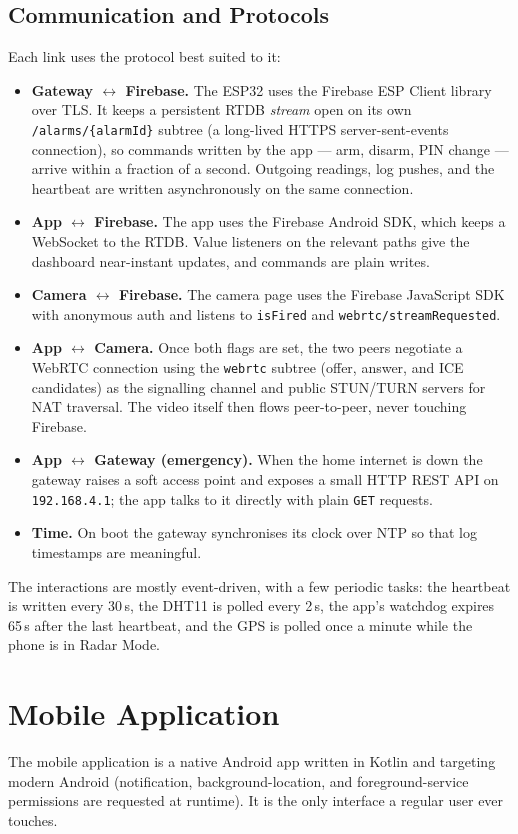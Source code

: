 \documentclass[10pt,twocolumn]{article}
\begin{document}
\subsection{Communication and Protocols}
Each link uses the protocol best suited to it:
\begin{itemize}
    \item \textbf{Gateway $\leftrightarrow$ Firebase.} The ESP32 uses the Firebase ESP Client library over TLS. It keeps a persistent RTDB \emph{stream} open on its own \texttt{/alarms/\{alarmId\}} subtree (a long-lived HTTPS server-sent-events connection), so commands written by the app --- arm, disarm, PIN change --- arrive within a fraction of a second. Outgoing readings, log pushes, and the heartbeat are written asynchronously on the same connection.
    \item \textbf{App $\leftrightarrow$ Firebase.} The app uses the Firebase Android SDK, which keeps a WebSocket to the RTDB. Value listeners on the relevant paths give the dashboard near-instant updates, and commands are plain writes.
    \item \textbf{Camera $\leftrightarrow$ Firebase.} The camera page uses the Firebase JavaScript SDK with anonymous auth and listens to \texttt{isFired} and \texttt{webrtc/streamRequested}.
    \item \textbf{App $\leftrightarrow$ Camera.} Once both flags are set, the two peers negotiate a WebRTC connection using the \texttt{webrtc} subtree (offer, answer, and ICE candidates) as the signalling channel and public STUN/TURN servers for NAT traversal. The video itself then flows peer-to-peer, never touching Firebase.
    \item \textbf{App $\leftrightarrow$ Gateway (emergency).} When the home internet is down the gateway raises a soft access point and exposes a small HTTP REST API on \texttt{192.168.4.1}; the app talks to it directly with plain \texttt{GET} requests.
    \item \textbf{Time.} On boot the gateway synchronises its clock over NTP so that log timestamps are meaningful.
\end{itemize}

The interactions are mostly event-driven, with a few periodic tasks: the heartbeat is written every 30\,s, the DHT11 is polled every 2\,s, the app's watchdog expires 65\,s after the last heartbeat, and the GPS is polled once a minute while the phone is in Radar Mode.

\section{Mobile Application}
The mobile application is a native Android app written in Kotlin and targeting modern Android (notification, background-location, and foreground-service permissions are requested at runtime). It is the only interface a regular user ever touches.
\end{document}
